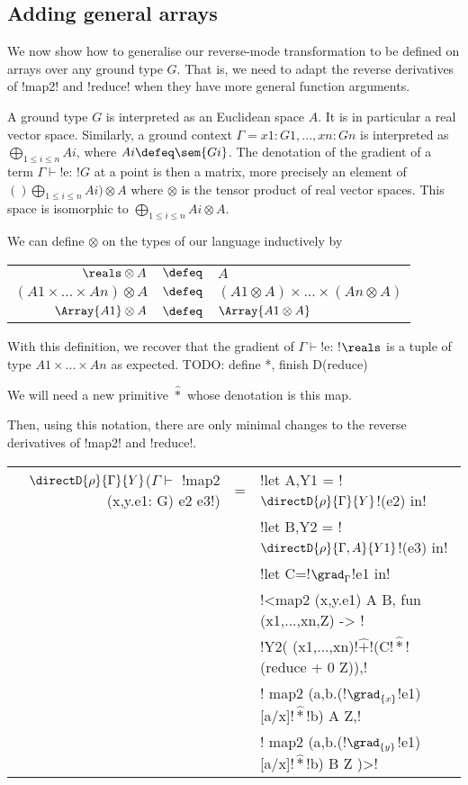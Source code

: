 \subsection{Adding general arrays} %
\label{sub:Adding general arrays}

We now show how to generalise our reverse-mode transformation to be defined on arrays over any ground type $G$.
That is, we need to adapt the reverse derivatives of !map2! and !reduce! when they have more general function arguments.

A ground type $G$ is interpreted as an Euclidean space $A$. 
It is in particular a real vector space.
Similarly, a ground context $\Gamma=x1:G1,...,xn:Gn$ is interpreted as $\bigoplus_{1\leq i\leq n}Ai$, where $Ai\defeq\sem{Gi}$.
The denotation of the gradient of a term $\Gamma \vdash$!e: !$G$ at a point is then a matrix, more precisely an element of $()\bigoplus_{1\leq i\leq n}Ai)\otimes A$
where $\otimes$ is the tensor product of real vector spaces. This space is isomorphic to $\bigoplus_{1\leq i\leq n}Ai\otimes A$.

We can define $\otimes$ on the types of our language inductively by

\begin{tabular}{r c l}
    $\reals \otimes A$ & $\defeq$ & $A$ \\
    $(A1 \times ... \times An)\otimes A$ & $\defeq$ & $(A1\otimes A) \times ... \times (An \otimes A)$ \\
    $\Array{A1} \otimes A$ & $\defeq$ & $\Array{A1\otimes A}$
\end{tabular}

With this definition, we recover that the gradient of $\Gamma \vdash$!e: !$\reals$ is a tuple of type $A1\times...\times An$ as expected.
TODO: define *, finish D(reduce)

We will need a new primitive $\widehat{*}$ whose denotation is this map.

Then, using this notation, there are only minimal changes to the reverse derivatives of !map2! and !reduce!.

\begin{center}
\begin{tabular}{r c l}
    $\directD{\rho}{\Gamma}{Y}$($\Gamma\vdash $ !map2 (x,y.e1: G) e2 e3!) &=&  
    !let A,Y1 = !$\directD{\rho}{\Gamma}{Y}$!(e2) in! \\
    && !let B,Y2 = !$\directD{\rho}{\Gamma,A}{Y1}$!(e3) in! \\
    && !let C=!$\grad_{\Gamma}$!e1 in!\\
    && !<map2 (x,y.e1) A B, fun (x1,...,xn,Z) -> !\\
    && !Y2( (x1,...,xn)!$\widehat{+}$!(C!$\widehat{*}$!(reduce + 0 Z)),!\\
    && \quad\quad! map2 (a,b.(!$\grad_{\{x\}}$!e1)[a/x]!$\widehat{*}$!b) A Z,!\\
    && \quad\quad! map2 (a,b.(!$\grad_{\{y\}}$!e1)[a/x]!$\widehat{*}$!b) B Z )>!\\
    \end{tabular}
    \end{center}

